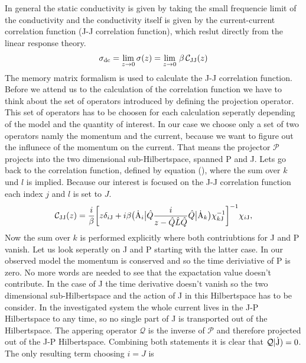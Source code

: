 In general the static conductivity is given by taking the small frequencie limit of the conductivity and the conductivity itself is given by the current-current correlation function (J-J correlation function), which reslut directly from the linear response theory.
%
\begin{align}
	\sigma_{\mathrm{dc}} = \lim\limits_{z \to 0} \sigma(z) = \lim\limits_{z \to 0}\, \beta\,\mathcal{C}_{\mathrm{JJ}}(z)
\end{align}
%
The memory matrix formalism is used to calculate the J-J correlation function.
Before we attend us to the calculation of the correlation function we have to think about the set of operators introduced by defining the projection operator.
This set of operators has to be choosen for each calculation seperatly depending of the model and the quantity of interest.
In our case we choose only a set of two operators namly the momentum and the current, because we want to figure out the influnece of the momentum on the current.
That means the projector $\mathcal{P}$ projects into the two dimensional sub-Hilbertspace, spanned P and J.
Lets go back to the correlation function, defined by equation (), where the sum over $k$ und $l$ is implied.
Because our interest is focused on the J-J correlation function each index $j$ and $l$ is set to $J$.
%
\begin{align}
	\mathcal{C}_{\mathrm{JJ}}(z) = 
		\frac{i}{\beta} \bigg[ 
			z \delta_{i\mathrm{J}} 
			+ 
			i \beta 
			\big({\dot{\mathrm{A}}_{i}}\big| 
			\hat{Q} \frac{i}{z - \hat{Q} \hat{L} \hat{Q}} \hat{Q} 
			\big|{\dot{\mathrm{A}}_{k}}\big)
			\chi_{k\mathrm{J}}^{-1}
		\bigg]^{-1}
		\chi_{i\mathrm{J}},
\end{align}
%
Now the sum over $k$ is performed explicitly where both contriubtions for J and P vanish.
Let us look seperatly on J and P starting with the latter case.
In our observed model the momentum is conserved and so the time deriviative of P is zero.
No more words are needed to see that the expactation value doesn't contribute.
In the case of J the time derivative doesn't vanish so the two dimensional sub-Hilbertspace and the action of J in this Hilbertspace has to be consider.
In the investigated system the whole current lives in the J-P Hilbertspace to any time, so no single part of J is transported out of the Hilbertspace.
The appering operator $\mathcal{Q}$ is the inverse of $\mathcal{P}$ and therefore projected out of the J-P Hilbertspace.
Combining both statements it is clear that $\mathcal{Q}|\mathrm{\dot{\mathrm{J}}}) = 0$.
The only resulting term choosing $i=J$ is
